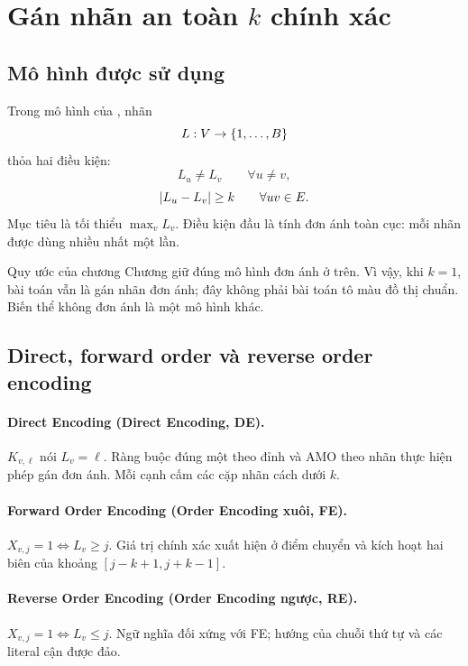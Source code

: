 \section[Gán nhãn an toàn k chính xác]{Gán nhãn an toàn \(k\) chính xác}

\subsection{Mô hình được sử dụng}

Trong mô hình của \textcite{thanh2026ksafe}, nhãn
\[
  L:V\rightarrow\left\{1,\ldots,B\right\}
\]
thỏa hai điều kiện:
\[
  L_u\ne L_v \qquad\forall u\ne v,
\]
\[
  \lvert L_u-L_v\rvert\ge k \qquad\forall uv\in E.
\]
Mục tiêu là tối thiểu \(\max_vL_v\). Điều kiện đầu là tính đơn ánh toàn cục:
mỗi nhãn được dùng nhiều nhất một lần.

\begin{designrule}{Quy ước của chương}
Chương giữ đúng mô hình đơn ánh ở trên. Vì vậy, khi \(k=1\), bài toán vẫn là
gán nhãn đơn ánh; đây không phải bài toán tô màu đồ thị chuẩn. Biến thể không đơn ánh là
một mô hình khác.
\end{designrule}

\subsection{Direct, forward order và reverse order encoding}

\paragraph{Direct Encoding (Direct Encoding, DE).}
\(K_{v,\ell}\) nói \(L_v=\ell\). Ràng buộc đúng một theo đỉnh và AMO theo nhãn
thực hiện phép gán đơn ánh. Mỗi cạnh cấm các cặp nhãn cách dưới \(k\).

\paragraph{Forward Order Encoding (Order Encoding xuôi, FE).}
\(X_{v,j}=1\iff L_v\ge j\). Giá trị chính xác xuất hiện ở điểm chuyển và kích
hoạt hai biên của khoảng \([j-k+1,j+k-1]\).

\paragraph{Reverse Order Encoding (Order Encoding ngược, RE).}
\(X_{v,j}=1\iff L_v\le j\). Ngữ nghĩa đối xứng với FE; hướng của chuỗi thứ tự
và các literal cận được đảo.

